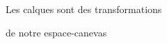 \documentclass[preview]{standalone}
\begin{document}
\begin{center}
Les calques sont des transformations 
        
de notre espace-canevas
\end{center}
\end{document}

